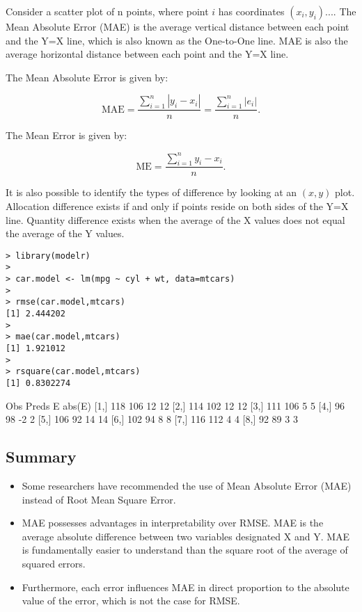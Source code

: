 \documentclass[]{report}
\begin{document}
Consider a scatter plot of n points, where point $i$ has coordinates $(x_i, y_i)...$. 
The Mean Absolute Error (MAE) is the average vertical distance between each point and the Y=X line, which is also known as the One-to-One line. MAE is also the average horizontal distance between each point and the Y=X line.

The Mean Absolute Error is given by:

\[{\displaystyle \mathrm {MAE} ={\frac {\sum _{i=1}^{n}\left|y_{i}-x_{i}\right|}{n}}={\frac {\sum _{i=1}^{n}\left|e_{i}\right|}{n}}.}\]


The Mean Error is given by:

\[{\displaystyle \mathrm {ME} ={\frac {\sum _{i=1}^{n}y_{i}-x_{i}}{n}}.} \]

It is also possible to identify the types of difference by looking at an ${\displaystyle (x,y)}$  plot. Allocation difference exists if and only if points reside on both sides of the Y=X line. Quantity difference exists when the average of the X values does not equal the average of the Y values.


\begin{framed}
\begin{verbatim}
> library(modelr)
>
> car.model <- lm(mpg ~ cyl + wt, data=mtcars)
>
> rmse(car.model,mtcars)
[1] 2.444202
>
> mae(car.model,mtcars)
[1] 1.921012
>
> rsquare(car.model,mtcars)
[1] 0.8302274
\end{verbatim}
\end{framed}

     Obs Preds E  abs(E)   
[1,] 118   106 12 12
[2,] 114   102 12 12
[3,] 111   106  5  5
[4,]  96    98 -2  2
[5,] 106    92 14 14
[6,] 102    94  8  8
[7,] 116   112  4  4
[8,]  92    89  3  3
\subsection*{Summary}
\begin{itemize}
	\item Some researchers have recommended the use of Mean Absolute Error (MAE) instead of Root Mean Square Error.
	\item  MAE possesses advantages in interpretability over RMSE. MAE is the average absolute difference between two variables designated X and Y. MAE is fundamentally easier to understand than the square root of the average of squared errors. 
	\item Furthermore, each error influences MAE in direct proportion to the absolute value of the error, which is not the case for RMSE.
\end{itemize}
\end{document}
